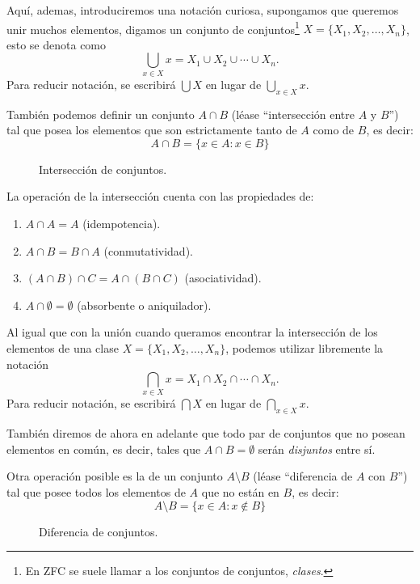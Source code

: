 \documentclass[11pt,oneside,a4paper]{book}
\begin{document}
Aquí, ademas, introduciremos una notación curiosa, supongamos que queremos unir muchos elementos, digamos un conjunto de conjuntos\footnote{En ZFC se suele llamar a los conjuntos de conjuntos, \textit{clases}.} $X=\{X_1,X_2,\dots,X_n\}$, esto se denota como
$$
\bigcup_{x\in X}x=X_1\cup X_2\cup\cdots\cup X_n.
$$
Para reducir notación, se escribirá $\bigcup X$ en lugar de $\bigcup_{x\in X}x$.

También podemos definir un conjunto $A\cap B$ (léase ``intersección entre $A$ y $B$'') tal que posea los elementos que son estrictamente tanto de $A$ como de $B$, es decir:
$$
A\cap B=\{x\in A:x\in B\}
$$
\begin{figure}
\centering
{}
\caption{Intersección de conjuntos.}
\end{figure}

\begin{prop}
La operación de la intersección cuenta con las propiedades de:
\begin{enumerate}
\item $A\cap A=A$ (idempotencia).
\item $A\cap B=B\cap A$ (conmutatividad).
\item $(A\cap B)\cap C=A\cap(B\cap C)$ (asociatividad).
\item $A\cap\emptyset=\emptyset$ (absorbente o aniquilador).
\end{enumerate}
\end{prop}

Al igual que con la unión cuando queramos encontrar la intersección de los elementos de una clase $X=\{X_1,X_2,\dots,X_n\}$, podemos utilizar libremente la notación
$$
\bigcap_{x\in X}x=X_1\cap X_2\cap\cdots\cap X_n.
$$
Para reducir notación, se escribirá $\bigcap X$ en lugar de $\bigcap_{x\in X}x$.

También diremos de ahora en adelante que todo par de conjuntos que no posean elementos en común, es decir, tales que $A\cap B=\emptyset$ serán \textit{disjuntos} entre sí.

Otra operación posible es la de un conjunto $A\setminus B$ (léase ``diferencia de $A$ con $B$'') tal que posee todos los elementos de $A$ que no están en $B$, es decir:
$$
A\setminus B=\{x\in A:x\notin B\}
$$
\begin{figure}
\centering
{}
\caption{Diferencia de conjuntos.}
\end{figure}
\end{document}
